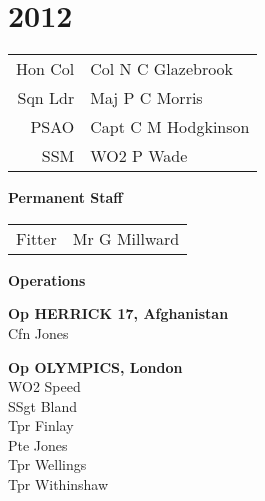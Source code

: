 \chapter*{2012}

\vspace*{20mm}

\begin{center}
  \begin{tabular}{rl}
    Hon Col & Col N C Glazebrook \\
    Sqn Ldr & Maj P C Morris \\
    PSAO & Capt C M Hodgkinson \\
    SSM & WO2 P Wade \\
  \end{tabular}
\end{center}

\begin{center}
  \Large
  \textbf{Permanent Staff}
\end{center}

\begin{center}
  \begin{tabular}{rl}
    Fitter & Mr G Millward \\
  \end{tabular}
\end{center}

\vspace*{20mm}

\begin{center}
  \Large
  \textbf{Operations}
\end{center}

\begin{multicols}{2}
  \noindent
  \textbf{Op HERRICK 17, Afghanistan} \\
  Cfn Jones \\

  \columnbreak
  
  \noindent
  \textbf{Op OLYMPICS, London} \\
  WO2 Speed \\
  SSgt Bland \\
  Tpr Finlay \\
  Pte Jones \\
  Tpr Wellings \\
  Tpr Withinshaw \\
\end{multicols}
